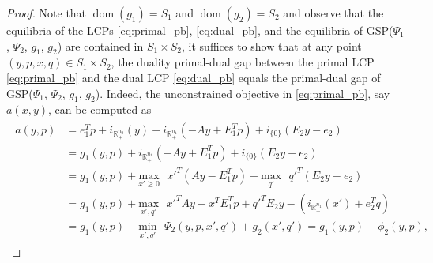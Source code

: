\documentclass[envcountsame]{llncs} %
\DeclareMathOperator{\dom}{dom}
\begin{document}
\begin{proof}
Note that $\dom(g_1) = S_1$ and $\dom(g_2) = S_2$ and observe that the
equilibria of the LCPs \eqref{eq:primal_pb}, \eqref{eq:dual_pb}, and
the equilibria of GSP($\Psi_1$, $\Psi_2$, $g_1$, $g_2$) are contained
in $S_1 \times S_2$, it suffices to show that at any point $(y, p, x,
q) \in S_1 \times S_2$, the duality primal-dual gap between the primal
LCP \eqref{eq:primal_pb} and the dual LCP \eqref{eq:dual_pb} equals
the primal-dual gap of GSP($\Psi_1$, $\Psi_2$, $g_1$, $g_2$).
Indeed, the unconstrained objective in \eqref{eq:primal_pb}, say
$a(x,y)$, can be computed as
\begin{eqnarray*}
  \begin{aligned}
    a(y,p) &= e_1^Tp +
    i_{\mathbb{R}^{n_2}_+}(y) + i_{\mathbb{R}^{n_1}_+}(-Ay + E_1^Tp) +
    i_{\{0\}}(E_2y - e_2)\\
    &= g_1(y,p) +
    i_{\mathbb{R}^{n_1}_+}(-Ay + E_1^Tp) + i_{\{0\}}(E_2y - e_2)\\
    &= g_1(y,p) + \underset{x' \geq
      0}{\text{max}}\text{ }x'^T(Ay - E_1^Tp) +
    \underset{q'}{\text{max}}\text{ }q'^T(E_2y - e_2)\\
    &= g_1(y,p) + \underset{x',
      q'}{\text{max}}\text{ }x'^TAy - x^TE_1^Tp + q'^TE_2y -
    (i_{\mathbb{R}^{n_1}_+}(x') + e_2^Tq)\\
    &= g_1(y,p)
      - \underset{x',q'}{\text{min}}\text{ }\Psi_2(y, p, x', q') + g_2(x',
      q') = g_1(y,p) -\phi_2(y,p),
  \end{aligned}
  \label{eq:a}
\end{eqnarray*}


\end{proof}
\end{document}
